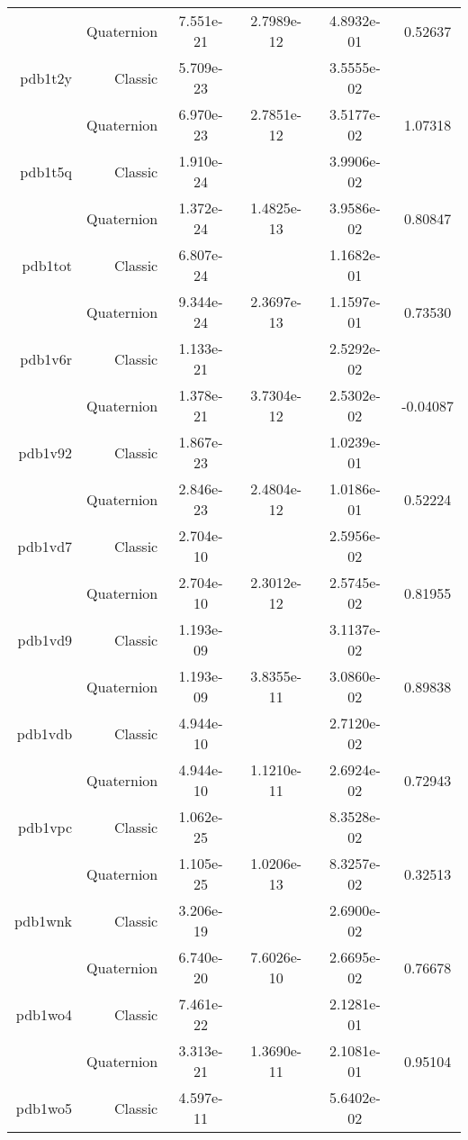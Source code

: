 \begin{xltabular}{\textwidth}{r|rS[table-format=1.3e+2]S[table-format=1.4e+2]S[table-format=1.4e+2]S[table-format=-1.5]}
& Quaternion & 7.551e-21 & 2.7989e-12 & 4.8932e-01 & 0.52637\\  \addlinespace
pdb1t2y & Classic & 5.709e-23 &  & 3.5555e-02 & \\
& Quaternion & 6.970e-23 & 2.7851e-12 & 3.5177e-02 & 1.07318\\  \addlinespace
pdb1t5q & Classic & 1.910e-24 &  & 3.9906e-02 & \\
& Quaternion & 1.372e-24 & 1.4825e-13 & 3.9586e-02 & 0.80847\\  \addlinespace
pdb1tot & Classic & 6.807e-24 &  & 1.1682e-01 & \\
& Quaternion & 9.344e-24 & 2.3697e-13 & 1.1597e-01 & 0.73530\\  \addlinespace
pdb1v6r & Classic & 1.133e-21 &  & 2.5292e-02 & \\
& Quaternion & 1.378e-21 & 3.7304e-12 & 2.5302e-02 & -0.04087\\  \addlinespace
pdb1v92 & Classic & 1.867e-23 &  & 1.0239e-01 & \\
& Quaternion & 2.846e-23 & 2.4804e-12 & 1.0186e-01 & 0.52224\\  \addlinespace
pdb1vd7 & Classic & 2.704e-10 &  & 2.5956e-02 & \\
& Quaternion & 2.704e-10 & 2.3012e-12 & 2.5745e-02 & 0.81955\\  \addlinespace
pdb1vd9 & Classic & 1.193e-09 &  & 3.1137e-02 & \\
& Quaternion & 1.193e-09 & 3.8355e-11 & 3.0860e-02 & 0.89838\\  \addlinespace
pdb1vdb & Classic & 4.944e-10 &  & 2.7120e-02 & \\
& Quaternion & 4.944e-10 & 1.1210e-11 & 2.6924e-02 & 0.72943\\  \addlinespace
pdb1vpc & Classic & 1.062e-25 &  & 8.3528e-02 & \\
& Quaternion & 1.105e-25 & 1.0206e-13 & 8.3257e-02 & 0.32513\\  \addlinespace
pdb1wnk & Classic & 3.206e-19 &  & 2.6900e-02 & \\
& Quaternion & 6.740e-20 & 7.6026e-10 & 2.6695e-02 & 0.76678\\  \addlinespace
pdb1wo4 & Classic & 7.461e-22 &  & 2.1281e-01 & \\
& Quaternion & 3.313e-21 & 1.3690e-11 & 2.1081e-01 & 0.95104\\  \addlinespace
pdb1wo5 & Classic & 4.597e-11 &  & 5.6402e-02 & \\

\end{xltabular}
